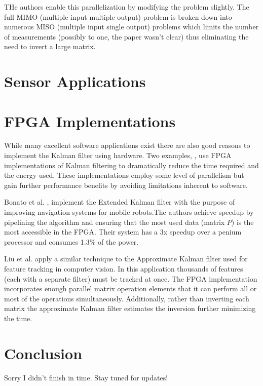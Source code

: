 \documentclass[11pt]{article}
\begin{document}
THe authors enable this parallelization by modifying the problem slightly. The full MIMO (multiple input multiple output) problem is broken down into numerous MISO (multiple input single output) problems which limits the number of measurements (possibly to one, the paper wasn't clear) thus eliminating the need to invert a large matrix.

\section{Sensor Applications}
\cite{rao1991fully,spanos2005distributed,spanos2005approximate,hashemipour1988decentralized}

\section{FPGA Implementations}
While many excellent software applications exist there are also good reasons to implement the Kalman filter using hardware. Two examples,  \cite{bonato2009floating,liu2007efficient}, use FPGA implementations of Kalman filtering to dramatically reduce the time required and the energy used. These implementations employ some level of parallelism but gain further performance benefits by avoiding limitations inherent to software.

Bonato et al. \cite{bonato2009floating}, implement the Extended Kalman filter with the purpose of improving navigation systems for mobile robots.The authors achieve speedup by pipelining the algorithm and ensuring that the most used data (matrix $P$) is the most accessible in the FPGA. Their system has a 3x speedup over a penium processor and consumes 1.3\% of the power. 

Liu et al. \cite{liu2007efficient} apply a similar technique to the Approximate Kalman filter used for feature tracking in computer vision. In this application thousands of features (each with a separate filter) must be tracked at once. The FPGA implementation incorporates enough parallel matrix operation elements that it can perform all or most of the operations simultaneously. Additionally, rather than inverting each matrix the approximate Kalman filter estimates the inversion further minimizing the time.

\section{Conclusion}
Sorry I didn't finish in time. Stay tuned for updates!

\nocite{*}


\end{document}
